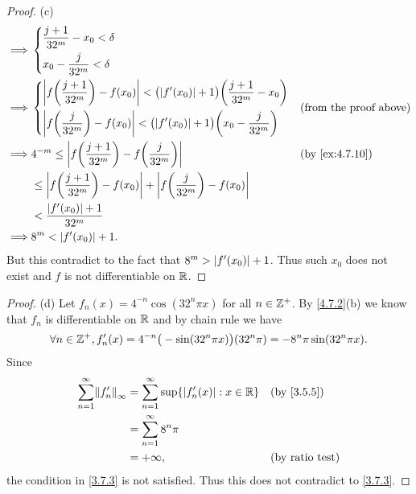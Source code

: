 \begin{proof}{(c)}
\begin{align*}
    \implies & \begin{dcases}
                 \dfrac{j + 1}{32^m} - x_0 < \delta \\
                 x_0 - \dfrac{j}{32^m} < \delta
               \end{dcases}                                                                                                                           \\
    \implies & \begin{dcases}
                 \abs{f\bigg(\dfrac{j + 1}{32^m}\bigg) - f(x_0)} < \big(\abs{f'(x_0)} + 1\big) \bigg(\dfrac{j + 1}{32^m} - x_0\bigg) \\
                 \abs{f\bigg(\dfrac{j}{32^m}\bigg) - f(x_0)} < \big(\abs{f'(x_0)} + 1\big) \bigg(x_0 - \dfrac{j}{32^m}\bigg)
               \end{dcases} &  & \text{(from the proof above)}                                      \\
    \implies & 4^{-m} \leq \abs{f\bigg(\dfrac{j + 1}{32^m}\bigg) - f\bigg(\dfrac{j}{32^m}\bigg)}                                          &  & \text{(by \cref{ex:4.7.10})} \\
             & \leq \abs{f\bigg(\dfrac{j + 1}{32^m}\bigg) - f(x_0)} + \abs{f\bigg(\dfrac{j}{32^m}\bigg) - f(x_0)}                                                           \\
             & < \dfrac{\abs{f'(x_0)} + 1}{32^m}                                                                                                                            \\
    \implies & 8^m < \abs{f'(x_0)} + 1.
  \end{align*}
  But this contradict to the fact that \(8^m > \left\lvert f'(x_0)\right\rvert + 1\).
  Thus such \(x_0\) does not exist and \(f\) is not differentiable on \(\mathbb{R}\).
\end{proof}

\begin{proof}{(d)}
  Let \(f_n(x) = 4^{-n} \cos(32^n \pi x)\) for all \(n \in \mathbb{Z}^+\).
  By \cref{4.7.2}(b) we know that \(f_n\) is differentiable on \(\mathbb{R}\) and by chain rule we have
  \[
    \forall n \in \mathbb{Z}^+, f_n'(x) = 4^{-n} \big(-\sin(32^n \pi x)\big) (32^n \pi) = - 8^n \pi \sin(32^n \pi x).
  \]
  Since
  \begin{align*}
    \sum_{n = 1}^\infty \norm*{f_n'}_\infty & = \sum_{n = 1}^\infty \sup\{\abs{f_n'(x)} : x \in \R\} &  & \text{(by \cref{3.5.5})} \\
                                            & = \sum_{n = 1}^\infty 8^n \pi                                                        \\
                                            & = +\infty,                                             &  & \text{(by ratio test)}
  \end{align*}
  the condition in \cref{3.7.3} is not satisfied.
  Thus this does not contradict to \cref{3.7.3}.
\end{proof}